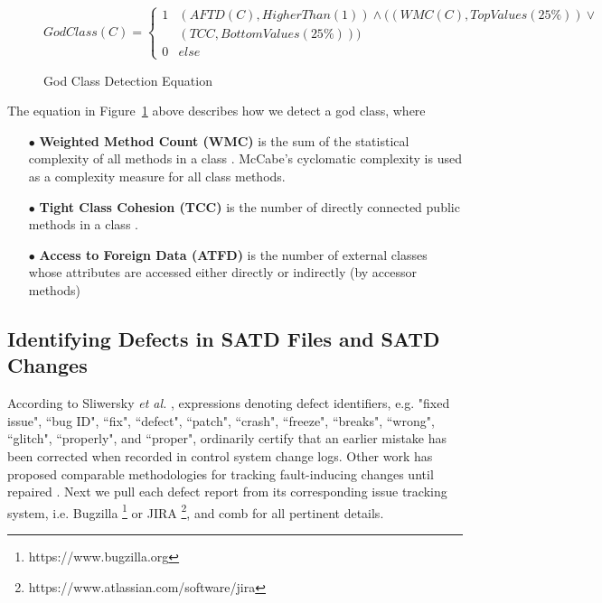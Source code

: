 \begin{figure}[h]
\[GodClass(C) = \left\{\begin{matrix}
1& (AFTD(C), HigherThan(1))  \wedge ((WMC(C), TopValues(25\%)) \vee \\ 
 & (TCC, BottomValues(25\%)))\\ 
0& else
\end{matrix}\right.\]
\caption{God Class Detection Equation}
\label{equation:1}
\end{figure}

The equation in Figure~\ref{equation:1} above describes how we detect a god class, where 


\begin{itemize}
\item[$\bullet$] \textbf{Weighted Method Count (WMC)} is the sum of the statistical complexity of all methods in a class \cite{Chidamber_Kemerer_94}. McCabe’s cyclomatic complexity \cite{McCabe_1976} is used as a complexity measure for all class methods.
\item[$\bullet$] \textbf{Tight Class Cohesion (TCC)} is the number of directly connected public methods in a class \cite{Bieman:1995:CRO:223427.211856}.
\item[$\bullet$] \textbf{Access to Foreign Data (ATFD)} is the number of external classes whose attributes are accessed either directly or indirectly (by accessor methods) \cite{Marinescu_PhD}
\end{itemize}

\subsection{Identifying Defects in SATD Files and SATD Changes}
\label{ch4_bugs_td}

According to Sliwersky \textit{et al.} \cite{sliwerski-msr-2005}, expressions denoting defect identifiers, e.g. "fixed issue", ``bug ID", ``fix", ``defect", ``patch", ``crash", ``freeze", ``breaks", ``wrong", ``glitch", ``properly", and ``proper", ordinarily certify that an earlier mistake has been corrected when recorded in control system change logs. Other work has proposed comparable methodologies for tracking fault-inducing changes until repaired \cite{Kamei-tse-2013, Kim-tse-2008, sliwerski-msr-2005}. Next we pull each defect report from its corresponding issue tracking system, i.e. Bugzilla \footnote{https://www.bugzilla.org} or JIRA \footnote{https://www.atlassian.com/software/jira}, and comb for all pertinent details.



